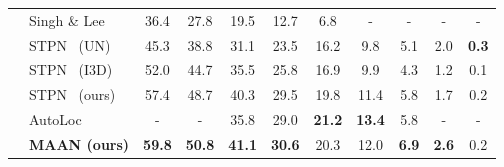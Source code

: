 \documentclass{article} \usepackage{iclr2019_conference,times}
\begin{document}
\begin{table}[t]
\begin{footnotesize}
{\begin{tabular}{llccccccccc}
                                   & Singh \& Lee  \citep{singh2017hide}          & 36.4 & 27.8 & 19.5 & 12.7 & 6.8  & -    & -    & -    & -\\  
                                   & STPN~\citep{nguyen2017weakly} (UN)  & 45.3 & 38.8 & 31.1 & 23.5 & 16.2 & 9.8 & 5.1 & 2.0 & \textbf{0.3} \\
                                   & STPN~\citep{nguyen2017weakly} (I3D)       & 52.0 & 44.7 & 35.5 & 25.8 & 16.9 & 9.9 & 4.3    & 1.2   & 0.1\\ 
                                   &
                                STPN~\citep{nguyen2017weakly} (ours)  & 57.4  &  48.7 & 40.3  &  29.5 &  19.8 &  11.4  & 5.8  &  1.7   &  0.2  \\    
                                   & AutoLoc~\citep{shou2018autoloc} & - & - &  35.8 & 29.0 & \textbf{21.2} & \textbf{13.4} & 5.8 & - & - \\
                                   & \textbf{MAAN (ours)}  & \textbf{59.8} & \textbf{50.8} & \textbf{41.1} & \textbf{30.6} & 20.3  & 12.0   &  \textbf{6.9}  &  \textbf{2.6}  & 0.2 \\ \bottomrule
\end{tabular}
}
\end{footnotesize}
\vspace{-2mm}
\end{table}
\vspace{-2mm}
\end{document}
